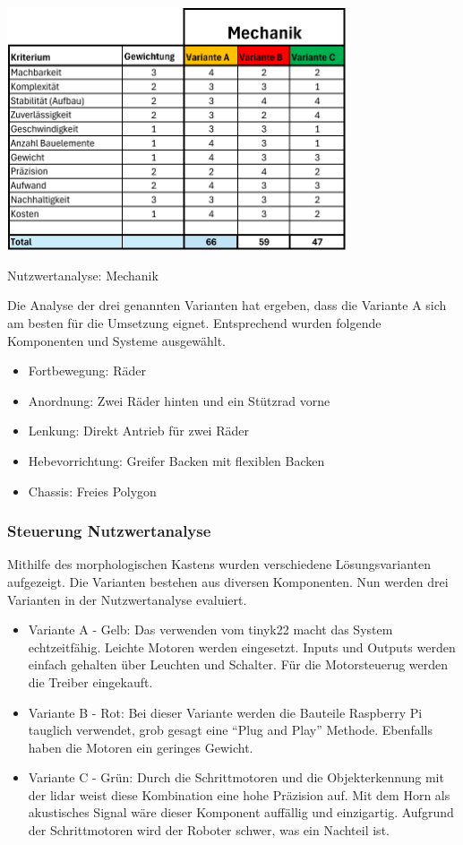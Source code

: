 \begin{table}[H]
\centering
\includegraphics[width=0.75\textwidth]{assets/Nutzwertanalyse-M.pdf}
\caption{Nutzwertanalyse: Mechanik}
\label{table:nutzwert-maschinentechnik}
\end{table}

Die Analyse der drei genannten Varianten hat ergeben, dass die Variante A sich am besten für die Umsetzung eignet. Entsprechend wurden folgende Komponenten und Systeme ausgewählt. 

\begin{itemize}
    \item Fortbewegung: Räder 
    \item Anordnung:  Zwei Räder hinten und ein Stützrad vorne
    \item Lenkung: Direkt Antrieb für zwei Räder
    \item Hebevorrichtung: Greifer Backen mit flexiblen Backen
    \item Chassis: Freies Polygon
\end{itemize}

\subsubsection{Steuerung Nutzwertanalyse}

Mithilfe des morphologischen Kastens wurden verschiedene Lösungsvarianten aufgezeigt. Die Varianten bestehen aus diversen Komponenten. 
Nun werden drei Varianten in der Nutzwertanalyse evaluiert.

\begin{itemize}
    \item Variante A - Gelb: Das verwenden vom \acrshort{tinyk22} macht das System echtzeitfähig. Leichte Motoren werden eingesetzt. Inputs und Outputs werden einfach gehalten über Leuchten und Schalter. Für die Motorsteuerug werden die Treiber eingekauft.
    \item Variante B - Rot: Bei dieser Variante werden die Bauteile Raspberry Pi tauglich verwendet, grob gesagt eine ``Plug and Play'' Methode. Ebenfalls haben die Motoren ein geringes Gewicht.
    \item Variante C - Grün: Durch die Schrittmotoren und die Objekterkennung mit der \acrfull{lidar} weist diese Kombination eine hohe Präzision auf. Mit dem Horn als akustisches Signal wäre dieser Komponent auffällig und einzigartig. Aufgrund der Schrittmotoren wird der Roboter schwer, was ein Nachteil ist.
\end{itemize}


